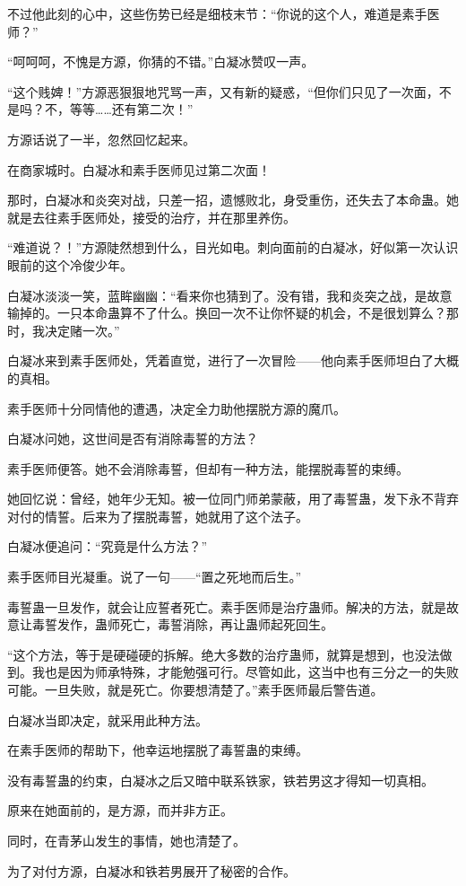 \begin{this_body}
不过他此刻的心中，这些伤势已经是细枝末节：“你说的这个人，难道是素手医师？”

“呵呵呵，不愧是方源，你猜的不错。”白凝冰赞叹一声。

“这个贱婢！”方源恶狠狠地咒骂一声，又有新的疑惑，“但你们只见了一次面，不是吗？不，等等……还有第二次！”

方源话说了一半，忽然回忆起来。

在商家城时。白凝冰和素手医师见过第二次面！

那时，白凝冰和炎突对战，只差一招，遗憾败北，身受重伤，还失去了本命蛊。她就是去往素手医师处，接受的治疗，并在那里养伤。

“难道说？！”方源陡然想到什么，目光如电。刺向面前的白凝冰，好似第一次认识眼前的这个冷俊少年。

白凝冰淡淡一笑，蓝眸幽幽：“看来你也猜到了。没有错，我和炎突之战，是故意输掉的。一只本命蛊算不了什么。换回一次不让你怀疑的机会，不是很划算么？那时，我决定赌一次。”

白凝冰来到素手医师处，凭着直觉，进行了一次冒险——他向素手医师坦白了大概的真相。

素手医师十分同情他的遭遇，决定全力助他摆脱方源的魔爪。

白凝冰问她，这世间是否有消除毒誓的方法？

素手医师便答。她不会消除毒誓，但却有一种方法，能摆脱毒誓的束缚。

她回忆说：曾经，她年少无知。被一位同门师弟蒙蔽，用了毒誓蛊，发下永不背弃对付的情誓。后来为了摆脱毒誓，她就用了这个法子。

白凝冰便追问：“究竟是什么方法？”

素手医师目光凝重。说了一句——“置之死地而后生。”

毒誓蛊一旦发作，就会让应誓者死亡。素手医师是治疗蛊师。解决的方法，就是故意让毒誓发作，蛊师死亡，毒誓消除，再让蛊师起死回生。

“这个方法，等于是硬碰硬的拆解。绝大多数的治疗蛊师，就算是想到，也没法做到。我也是因为师承特殊，才能勉强可行。尽管如此，这当中也有三分之一的失败可能。一旦失败，就是死亡。你要想清楚了。”素手医师最后警告道。

白凝冰当即决定，就采用此种方法。

在素手医师的帮助下，他幸运地摆脱了毒誓蛊的束缚。

没有毒誓蛊的约束，白凝冰之后又暗中联系铁家，铁若男这才得知一切真相。

原来在她面前的，是方源，而并非方正。

同时，在青茅山发生的事情，她也清楚了。

为了对付方源，白凝冰和铁若男展开了秘密的合作。


\end{this_body}
